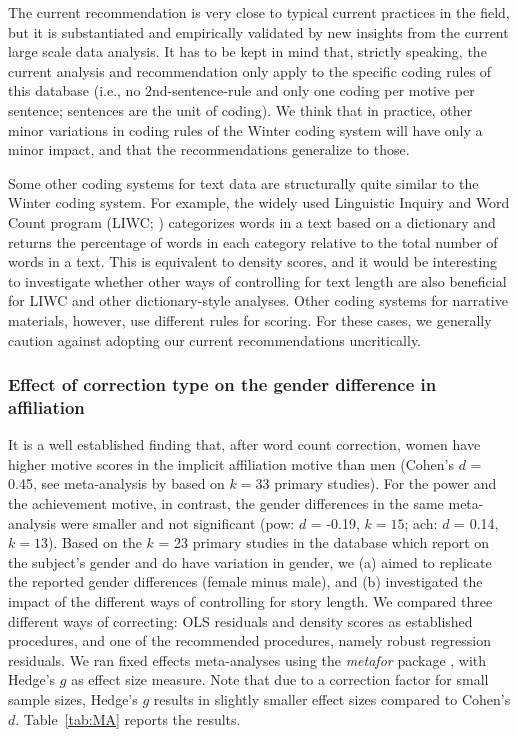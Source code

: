 \documentclass[man,a4paper,mask]{apa6}\usepackage[]{graphicx}\usepackage[]{color}
\begin{document}
The current recommendation is very close to typical current practices in the field, but it is substantiated and empirically validated by new insights from the current large scale data analysis. It has to be kept in mind that, strictly speaking, the current analysis and recommendation only apply to the specific coding rules of this database (i.e., no 2nd-sentence-rule and only one coding per motive per sentence; sentences are the unit of coding). We think that in practice, other minor variations in coding rules of the Winter coding system will have only a minor impact, and that the recommendations generalize to those.

Some other coding systems for text data are structurally quite similar to the Winter coding system. For example, the widely used Linguistic Inquiry and Word Count program (LIWC; ) categorizes words in a text based on a dictionary and returns the percentage of words in each category relative to the total number of words in a text. This is equivalent to density scores, and it would be interesting to investigate whether other ways of controlling for text length are also beneficial for LIWC and other dictionary-style analyses. Other coding systems for narrative materials, however, use different rules for scoring. For these cases, we generally caution against adopting our current recommendations uncritically.



\subsubsection{Effect of correction type on the gender difference in affiliation}
It is a well established finding that, after word count correction, women have higher motive scores in the implicit affiliation motive than men (Cohen's $d$ = 0.45, see meta-analysis by  based on $k = 33$ primary studies). 
For the power and the achievement motive, in contrast, the gender differences in the same meta-analysis were smaller and not significant (pow: $d$ = -0.19, $k = 15$; ach: $d$ = 0.14, $k = 13$).
Based on the $k$ = 23 primary studies in the database which report on the subject's gender and do have variation in gender, we (a) aimed to replicate the reported gender differences (female minus male), and (b) investigated the impact of the different ways of controlling for story length.
We compared three different ways of correcting: OLS residuals and density scores as established procedures, and one of the recommended procedures, namely robust regression residuals. We ran fixed effects meta-analyses using the \emph{metafor} package \parencite{viechtbauer_conducting_2010}, with Hedge's $g$ as effect size measure. Note that due to a correction factor for small sample sizes, Hedge's $g$ results in slightly smaller effect sizes compared to Cohen's $d$. Table~\ref{tab:MA} reports the results.
\end{document}
